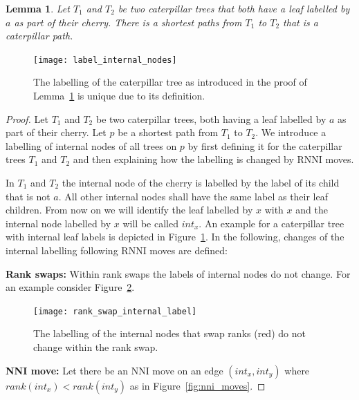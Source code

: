 \documentclass[11pt, a4paper]{article}
\newcommand{\nni}{\mathrm{NNI}}
\newcommand{\rnni}{\mathrm{RNNI}}
\newtheorem{lemma}[definition]{Lemma}
\begin{document}
\begin{lemma}
	Let $T_1$ and $T_2$ be two caterpillar trees that both have a leaf labelled by $a$ as part of their cherry.
	There is a shortest paths from $T_1$ to $T_2$ that is a caterpillar path.
	\label{lemma:caterpillar_subset_convex}
\end{lemma}

\begin{figure}[h]
	\centering
	\texttt{[image: label\_internal\_nodes]}
	\caption{The labelling of the caterpillar tree as introduced in the proof of Lemma~\ref{lemma:caterpillar_subset_convex} is unique due to its definition.
	}
	\label{label_internal_nodes}
\end{figure}

\begin{proof}
	Let $T_1$ and $T_2$ be two caterpillar trees, both having a leaf labelled by $a$ as part of their cherry.
	Let $p$ be a shortest path from $T_1$ to $T_2$.
	We introduce a labelling of internal nodes of all trees on $p$ by first defining it for the caterpillar trees $T_1$ and $T_2$ and then explaining how the labelling is changed by $\rnni$ moves.

	In $T_1$ and $T_2$ the internal node of the cherry is labelled by the label of its child that is not $a$.
	All other internal nodes shall have the same label as their leaf children.
	From now on we will identify the leaf labelled by $x$ with $x$ and the internal node labelled by $x$ will be called $int_x$.
	An example for a caterpillar tree with internal leaf labels is depicted in Figure~\ref{label_internal_nodes}.
	In the following, changes of the internal labelling following $\rnni$ moves are defined:

	\textbf{Rank swaps:}
	Within rank swaps the labels of internal nodes do not change.
	For an example consider Figure~\ref{fig:rank_swap_internal_label}.

	\begin{figure}[H]
		\centering
		\texttt{[image: rank\_swap\_internal\_label]}
		\caption{The labelling of the internal nodes that swap ranks (red) do not change within the rank swap.
		}
		\label{fig:rank_swap_internal_label}
	\end{figure}

	\textbf{NNI move:}
	Let there be an $\nni$ move on an edge $(int_x, int_y)$ where $rank(int_x) < rank(int_y)$ as in Figure~\ref{fig:nni_moves}.


\end{proof}
\end{document}
